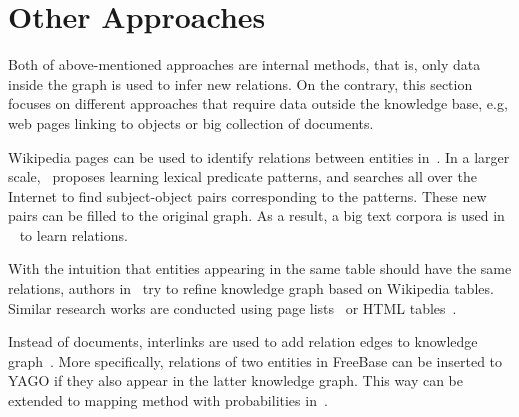 \section{Other Approaches}

Both of above-mentioned approaches are internal methods, that is, only data inside the graph is used to infer new relations. On the contrary, this section focuses on different approaches that require data outside the knowledge base, e.g, web pages linking to objects or big collection of documents.

Wikipedia pages can be used to identify relations between entities in~\cite{ref18}. In a larger scale,~\cite{ref19} proposes learning lexical predicate patterns, and searches all over the Internet to find subject-object pairs corresponding to the patterns. These new pairs can be filled to the original graph. As a result, a big text corpora is used in ~\cite{ref19} to learn relations.

With the intuition that entities appearing in the same table should have the same relations, authors in~\cite{ref20} try to refine knowledge graph based on Wikipedia tables. Similar research works are conducted using page lists~\cite{ref21} or HTML tables~\cite{ref22}.

Instead of documents, interlinks are used to add relation edges to knowledge graph~\cite{ref23, ref24}. More specifically, relations of two entities in FreeBase can be inserted to YAGO if they also appear in the latter knowledge graph. This way can be extended to mapping method with probabilities in~\cite{ref25}.